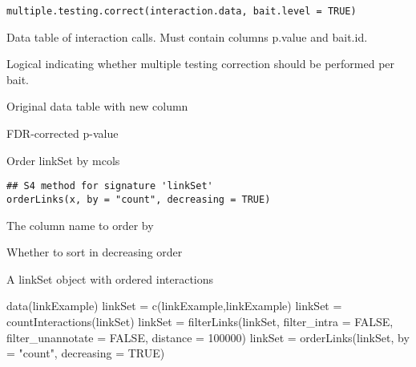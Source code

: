 \documentclass[letterpaper]{book}
\begin{document}
%
\begin{Usage}
\begin{verbatim}
multiple.testing.correct(interaction.data, bait.level = TRUE)
\end{verbatim}
\end{Usage}
%
\begin{Arguments}
\begin{ldescription}
\item[\code{interaction.data}] Data table of interaction calls. Must contain columns p.value and bait.id.

\item[\code{bait.level}] Logical indicating whether multiple testing correction should be performed per bait.
\end{ldescription}
\end{Arguments}
%
\begin{Value}
Original data table with new column
\begin{ldescription}
\item[\code{q.value}] FDR-corrected p-value
\end{ldescription}
\end{Value}
%
\begin{Description}
Order linkSet by mcols
\end{Description}
%
\begin{Usage}
\begin{verbatim}
## S4 method for signature 'linkSet'
orderLinks(x, by = "count", decreasing = TRUE)
\end{verbatim}
\end{Usage}
%
\begin{Arguments}
\begin{ldescription}
\item[\code{by}] The column name to order by

\item[\code{decreasing}] Whether to sort in decreasing order
\end{ldescription}
\end{Arguments}
%
\begin{Value}
A linkSet object with ordered interactions
\end{Value}
%
\begin{Examples}
\begin{ExampleCode}
data(linkExample)
linkSet = c(linkExample,linkExample)
linkSet = countInteractions(linkSet)
linkSet = filterLinks(linkSet, filter_intra = FALSE, filter_unannotate = FALSE, distance = 100000)
linkSet = orderLinks(linkSet, by = "count", decreasing = TRUE)
\end{ExampleCode}
\end{Examples}
\end{document}
